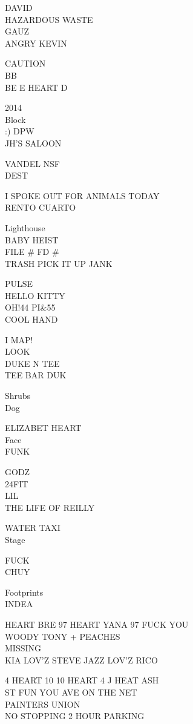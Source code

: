 \documentclass[10pt,letterpaper]{article}
\begin{document}
DAVID\\
HAZARDOUS WASTE\\
GAUZ\\
ANGRY KEVIN

CAUTION\\
BB\\
BE E HEART D

2014\\
Block\\
:) DPW\\
JH'S SALOON

VANDEL NSF\\
DEST

I SPOKE OUT FOR ANIMALS TODAY\\
RENTO CUARTO

Lighthouse\\
BABY HEIST\\
FILE \# FD \#\\
TRASH PICK IT UP JANK

PULSE\\
HELLO KITTY\\
OH!44 PI\&55\\
COOL HAND

I MAP!\\
LOOK\\
DUKE N TEE\\
TEE BAR DUK

Shrubs\\
Dog

ELIZABET HEART\\
Face\\
FUNK

GODZ\\
24FIT\\
LIL\\
THE LIFE OF REILLY

WATER TAXI\\
Stage

FUCK\\
CHUY

Footprints\\
INDEA

HEART BRE 97 HEART YANA 97 FUCK YOU\\
WOODY TONY + PEACHES\\
MISSING\\
KIA LOV'Z STEVE JAZZ LOV'Z RICO

4 HEART 10 10 HEART 4 J HEAT ASH\\
ST FUN YOU AVE ON THE NET\\
PAINTERS UNION\\
NO STOPPING 2 HOUR PARKING
\end{document}
